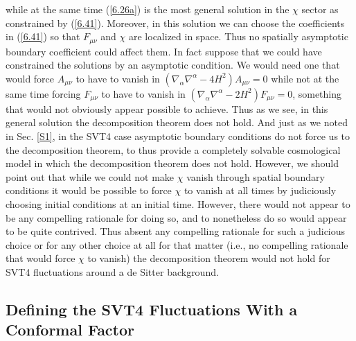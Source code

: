 \documentclass[aps,onecolumn,10pt]{revtex4}
\numberwithin{equation}{section}
\numberwithin{equation}{section}
\begin{document}
while at the same time (\ref{6.26a}) is the most general solution in the $\chi$ sector as constrained by (\ref{6.41}). Moreover, in this solution we can choose the coefficients in (\ref{6.41}) so that $F_{\mu\nu}$ and $\chi$ are localized in space. Thus no spatially asymptotic boundary coefficient could affect them. In fact suppose that we could have constrained the solutions by an asymptotic condition. We would need one that would force $A_{\mu\nu}$ to have to vanish in $(\nabla_{\alpha}\nabla^{\alpha}-4H^2)A_{\mu\nu}=0$ while not at the same time forcing $F_{\mu\nu}$ to have to vanish in $(\nabla_{\alpha}\nabla^{\alpha}-2H^2)F_{\mu\nu}=0$, something that would not obviously appear possible to achieve. Thus as we see, in this general solution the decomposition theorem does not hold. And just as we noted in Sec. \ref{S1},  in the SVT4 case asymptotic boundary conditions do not force us to the decomposition theorem, to thus provide a completely solvable cosmological model in which the decomposition theorem does not hold. However, we should point out that while we could not make $\chi$ vanish through spatial boundary conditions it would be possible to force $\chi$ to vanish at all times by judiciously choosing initial  conditions at an initial time.  However, there would not appear to be any compelling rationale for doing so, and  to nonetheless do so would appear to be quite contrived. Thus absent any compelling rationale for such a judicious choice or for any other choice at all for that matter (i.e., no compelling rationale that would force $\chi$ to vanish) the decomposition theorem would not hold for SVT4 fluctuations around a de Sitter background.


\subsection{Defining the SVT4 Fluctuations With a Conformal Factor}
\end{document}
